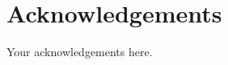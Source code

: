 \documentclass[]{msu-thesis}
\begin{document}
\clearpage

\makecopyrightpage

%
%
\clearpage
\chapter*{Acknowledgements}
\DoubleSpacing %
Your acknowledgements here.
%
\clearpage
\SingleSpacing
\tableofcontents* %
\clearpage
\listoftables %
\clearpage
\listoffigures %
%
%
\mainmatter
%


%








%
%
%
%
%
  
\end{document}
